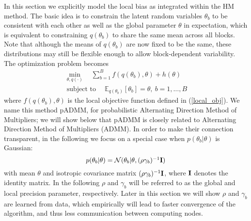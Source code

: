 \documentclass{article}
\DeclareMathOperator*{\st}{subject~to}
\newcommand{\Imat}[0]{\ensuremath{{\bf I}}\xspace}
\newcommand{\1}[0]{\ensuremath{\boldsymbol{1}}\xspace}
\begin{document}
In this section we explicitly model the local bias as integrated within the HM method. The basic idea is to constrain the latent random variables $\theta_b$ to be consistent with each other as well as the global parameter $\theta$ in expectation, which is equivalent to constraining $q(\theta_b)$ to share the same mean across all blocks. Note that although the means of $q(\theta_b)$ are now fixed to be the same, these distributions may still be flexible enough to allow block-dependent variability. The optimization problem becomes
\begin{equation}\label{padmm}
\begin{gathered}
\textstyle\min_{\theta, q(\cdot)} \quad\textstyle\sum_{b=1}^B f(q(\theta_b), \theta) + h(\theta)\\
\textstyle\st \quad \mathbb{E}_{q(\theta_b)}[\theta_b] = \theta, ~ b = 1, \ldots, B
\end{gathered}
\end{equation}
where $f(q(\theta_b), \theta)$ is the local objective function defined in (\ref{local_obj}). We name this method pADMM, for probabilistic Alternating Direction Method of Multipliers; we will show below that pADMM is closely related to Alternating Direction Method of Multipliers (ADMM). In order to make their connection transparent, in the following we focus on a special case when $p(\theta_b|\theta)$ is Gaussian:
\begin{equation}\label{gaussian_prior}
\textstyle p(\theta_b|\theta) = \mathcal{N}(\theta_b | \theta, (\rho\gamma_b)^{-1}\Imat)
\end{equation}
with mean $\theta$ and isotropic covariance matrix $(\rho\gamma_b)^{-1}\Imat$, where $\Imat$ denotes the identity matrix. In the following $\rho$ and $\gamma_b$ will be referred to as the global and local precision parameter, respectively. Later in this section we will show $\rho$ and $\gamma_b$ are learned from data, which empirically will lead to faster convergence of the algorithm, and thus less communication between computing nodes.
\end{document}
